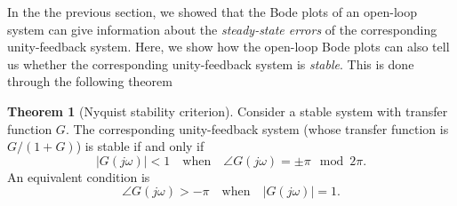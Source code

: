 \documentclass[a4paper,11pt]{report}
\theoremstyle{definition}
\newtheorem{theorem}{Theorem}
\begin{document}
In the the previous section, we showed that the Bode plots of an
open-loop system can give information about the \emph{steady-state
  errors} of the corresponding unity-feedback system. Here, we show
how the open-loop Bode plots can also tell us whether the
corresponding unity-feedback system is \emph{stable}. This is done
through the following theorem

\begin{theorem}[Nyquist stability criterion]
  Consider a stable system with transfer function $G$. The
  corresponding unity-feedback system (whose transfer function is
  $G/(1+G)$) is stable if and only if
  \begin{equation}
    \label{eq:nyq}
    |G(j\omega)| < 1\quad \textrm{when}\quad \angle G(j\omega) = \pm\pi
    \mod 2\pi.  
  \end{equation}
  An equivalent condition is
  \begin{equation}
    \label{eq:nyq2}
    \angle G(j\omega) > -\pi \quad \textrm{when}\quad
    |G(j\omega)| = 1.  
  \end{equation}
\end{theorem}
\end{document}
